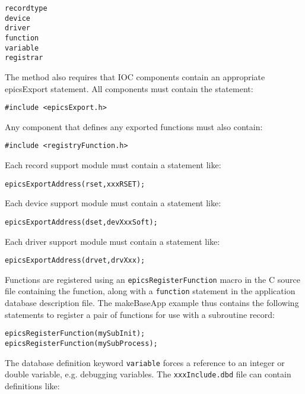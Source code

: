 \begin{verbatim}
recordtype
device
driver
function
variable
registrar
\end{verbatim}

The method also requires that IOC components contain an appropriate epicsExport statement.
All components must contain the statement:

\begin{verbatim}
#include <epicsExport.h>
\end{verbatim}

Any component that defines any exported functions must also contain:

\begin{verbatim}
#include <registryFunction.h>
\end{verbatim}

Each record support module must contain a statement like:

\begin{verbatim}
epicsExportAddress(rset,xxxRSET);
\end{verbatim}

Each device support module must contain a statement like:

\begin{verbatim}
epicsExportAddress(dset,devXxxSoft);
\end{verbatim}

Each driver support module must contain a statement like:

\begin{verbatim}
epicsExportAddress(drvet,drvXxx);
\end{verbatim}

Functions are registered using an \verb|epicsRegisterFunction| macro in the C source file containing the function, along with a \verb|function| statement in the application database description file.
The makeBaseApp example thus contains the following statements to register a pair of functions for use with a subroutine record:

\begin{verbatim}
epicsRegisterFunction(mySubInit);
epicsRegisterFunction(mySubProcess);
\end{verbatim}

The database definition keyword \verb|variable| forces a reference to an integer or double variable, e.g. debugging variables.
The \verb|xxxInclude.dbd| file can contain definitions like:

